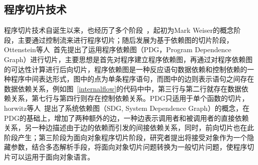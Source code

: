 \subsection{程序切片技术}
程序切片技术自诞生以来，也经历了多个阶段~\cite{slices:xu2005brief}，起初为Mark Weiser的概念阶段，主要通过控制流来进行程序切片；随后发展为基于依赖图的切片阶段，Ottenstein等人~\cite{slices:ottenstein1984program}首先提出了运用程序依赖图（PDG，Program Dependence Graph）进行切片，主要思想是首先对程序建立程序依赖图，再通过对程序依赖图的可达性计算进行后向切片，程序依赖图是一种反应语句数据依赖和控制依赖的一种程序中间表达形式，图中的点为单条程序语句，而图中的边则表示语句之间存在数据依赖关系，例如图~\ref{internalflow}的代码中中，第三行与第二行就存在数据依赖关系，第七行与第四行则存在控制依赖关系。PDG只适用于单个函数的切片，horwitz等人~\cite{slices:horwitz1990}提出了系统依赖图（SDG, System Dependence Graph）的概念，在PDG的基础上，增加了两种额外的边，一种边表示调用者和被调用者的直接依赖关系，另一种边描述由于边的依赖而引发的间接依赖关系，同时，前向切片也在此阶段产生；第三阶段为面向对象程序切片阶段，研究者提出将接受对象作为一个隐藏参数，结合多态解析手段，将面向对象切片问题转换为一般切片问题，使程序切片可以运用于面向对象语言。

